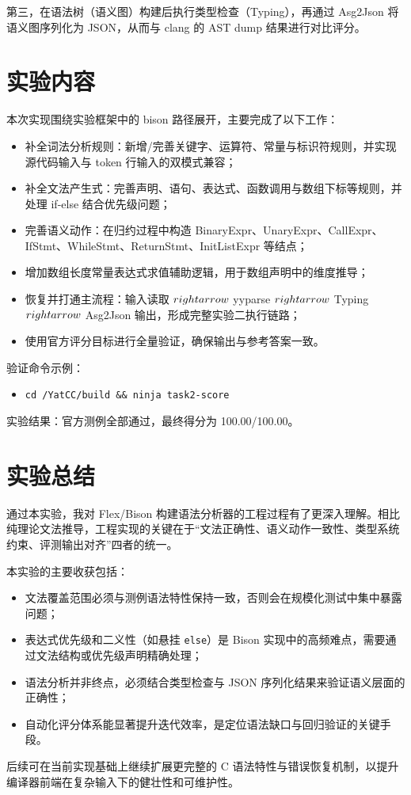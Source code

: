 \documentclass[UTF8,a4paper,12pt]{ctexart}
\begin{document}
第三，在语法树（语义图）构建后执行类型检查（Typing），再通过 Asg2Json 将语义图序列化为 JSON，从而与 clang 的 AST dump 结果进行对比评分。

\section{实验内容}
本次实现围绕实验框架中的 bison 路径展开，主要完成了以下工作：

\begin{itemize}
  \item 补全词法分析规则：新增/完善关键字、运算符、常量与标识符规则，并实现源代码输入与 token 行输入的双模式兼容；
  \item 补全文法产生式：完善声明、语句、表达式、函数调用与数组下标等规则，并处理 if-else 结合优先级问题；
  \item 完善语义动作：在归约过程中构造 BinaryExpr、UnaryExpr、CallExpr、IfStmt、WhileStmt、ReturnStmt、InitListExpr 等结点；
  \item 增加数组长度常量表达式求值辅助逻辑，用于数组声明中的维度推导；
  \item 恢复并打通主流程：输入读取 $\\rightarrow$ yyparse $\\rightarrow$ Typing $\\rightarrow$ Asg2Json 输出，形成完整实验二执行链路；
  \item 使用官方评分目标进行全量验证，确保输出与参考答案一致。
\end{itemize}

验证命令示例：
\begin{itemize}
  \item \texttt{cd /YatCC/build \&\& ninja task2-score}
\end{itemize}

实验结果：官方测例全部通过，最终得分为 100.00/100.00。

\section{实验总结}
通过本实验，我对 Flex/Bison 构建语法分析器的工程过程有了更深入理解。相比纯理论文法推导，工程实现的关键在于“文法正确性、语义动作一致性、类型系统约束、评测输出对齐”四者的统一。

本实验的主要收获包括：
\begin{itemize}
  \item 文法覆盖范围必须与测例语法特性保持一致，否则会在规模化测试中集中暴露问题；
  \item 表达式优先级和二义性（如悬挂 \texttt{else}）是 Bison 实现中的高频难点，需要通过文法结构或优先级声明精确处理；
  \item 语法分析并非终点，必须结合类型检查与 JSON 序列化结果来验证语义层面的正确性；
  \item 自动化评分体系能显著提升迭代效率，是定位语法缺口与回归验证的关键手段。
\end{itemize}

后续可在当前实现基础上继续扩展更完整的 C 语法特性与错误恢复机制，以提升编译器前端在复杂输入下的健壮性和可维护性。
\end{document}
